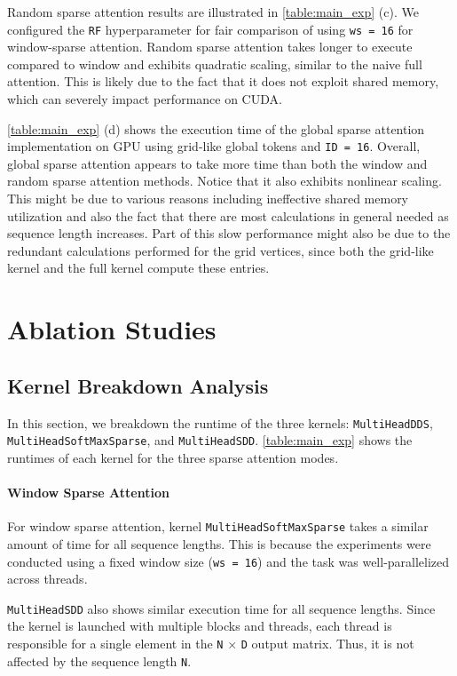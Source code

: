 \documentclass[11pt]{article}
\begin{document}
Random sparse attention results are illustrated in \autoref{table:main_exp} (c). We configured the \texttt{RF} hyperparameter for fair comparison of using \texttt{ws = 16} for window-sparse attention. Random sparse attention takes longer to execute compared to window and exhibits quadratic scaling, similar to the naive full attention. This is likely due to the fact that it does not exploit shared memory, which can severely impact performance on CUDA.

\autoref{table:main_exp} (d) shows the execution time of the global sparse attention implementation on GPU using grid-like global tokens and \texttt{ID = 16}. Overall, global sparse attention appears to take more time than both the window and random sparse attention methods. Notice that it also exhibits nonlinear scaling. This might be due to various reasons including ineffective shared memory utilization and also the fact that there are most calculations in general needed as sequence length increases. Part of this slow performance might also be due to the redundant calculations performed for the grid vertices, since both the grid-like kernel and the full kernel compute these entries.
\section{Ablation Studies}

\subsection{Kernel Breakdown Analysis}
In this section, we breakdown the runtime of the three kernels: \texttt{MultiHeadDDS}, \texttt{MultiHeadSoftMaxSparse}, and \texttt{MultiHeadSDD}. \autoref{table:main_exp} shows the runtimes of each kernel for the three sparse attention modes.

\paragraph{Window Sparse Attention} For window sparse attention, kernel \texttt{MultiHeadSoftMaxSparse} takes a similar amount of time for all sequence lengths. This is because the experiments were conducted using a fixed window size (\texttt{ws = 16}) and the task was well-parallelized across threads.

\texttt{MultiHeadSDD} also shows similar execution time for all sequence lengths. Since the kernel is launched with multiple blocks and threads, each thread is responsible for a single element in the \texttt{N} $\times$ \texttt{D} output matrix. Thus, it is not affected by the sequence length \texttt{N}. 
\end{document}
